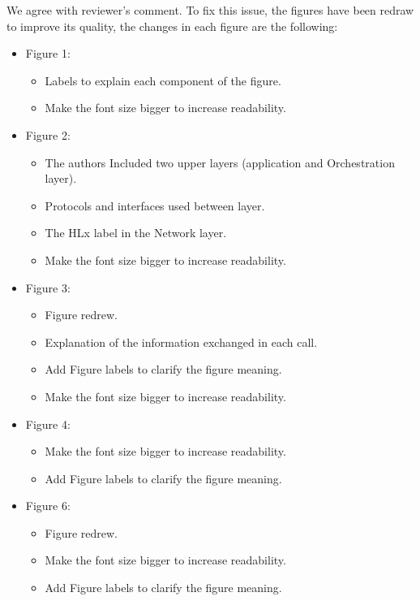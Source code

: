 \documentclass[12pt]{journalrebuttal}
\begin{document}
\begin{response}
We agree with reviewer's comment. To fix this issue, the figures have been redraw to improve its quality, the changes in each figure are the following:
\begin{itemize}
    \item Figure 1: 
    \begin{itemize}
        \item Labels to explain each component of the figure.
        \item Make the font size bigger to increase readability.
    \end{itemize}
    \item Figure 2:
    \begin{itemize}
        \item The authors Included two upper layers (application and Orchestration layer). 
        \item Protocols and interfaces used between layer.
        \item The HLx label in the Network layer.
        \item Make the font size bigger to increase readability.
    \end{itemize}
    \item Figure 3:
    \begin{itemize}
        \item Figure redrew.
        \item Explanation of the information exchanged in each call.
        \item Add Figure labels to clarify the figure meaning.
        \item Make the font size bigger to increase readability.
    \end{itemize}
    \item Figure 4:
      \begin{itemize}
        \item Make the font size bigger to increase readability.
         \item Add Figure labels to clarify the figure meaning.
    \end{itemize}
    \item Figure 6:
    \begin{itemize}
        \item Figure redrew.
        \item Make the font size bigger to increase readability.
        \item Add Figure labels to clarify the figure meaning.
    \end{itemize}
\end{itemize}

\end{response}
\end{document}
